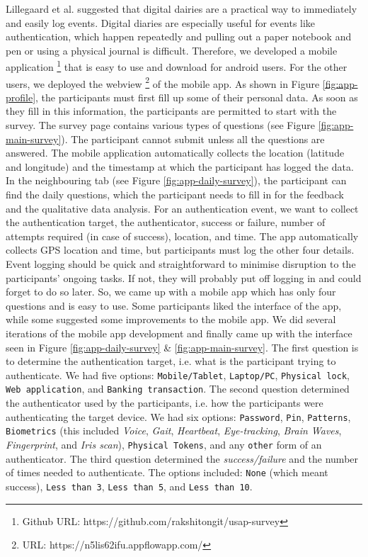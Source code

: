 Lillegaard et al. \cite{lillegaard} suggested that digital dairies are a practical way to immediately and easily log events. Digital diaries are especially useful for events like authentication, which happen repeatedly and pulling out a paper notebook and pen or using a physical journal is difficult. Therefore, we developed a mobile application%
\footnote{Github URL: https://github.com/rakshitongit/usap-survey} that is easy to use and download for android users. For the other users, we deployed the webview%
\footnote{URL: https://n5lis62ifu.appflowapp.com/} of the mobile app. As shown in Figure \ref{fig:app-profile}, the participants must first fill up some of their personal data. As soon as they fill in this information, the participants are permitted to start with the survey. The survey page contains various types of questions (see Figure \ref{fig:app-main-survey}). The participant cannot submit unless all the questions are answered. The mobile application automatically collects the location (latitude and longitude) and the timestamp at which the participant has logged the data. In the neighbouring tab (see Figure \ref{fig:app-daily-survey}), the participant can find the daily questions, which the participant needs to fill in for the feedback and the qualitative data analysis. For an authentication event, we want to collect the authentication target, the authenticator, success or failure, number of attempts required (in case of success), location, and time. The app automatically collects GPS location and time, but participants must log the other four details. Event logging should be quick and straightforward to minimise disruption to the participants' ongoing tasks. If not, they will probably put off logging in and could forget to do so later. So, we came up with a mobile app which has only four questions and is easy to use. Some participants liked the interface of the app, while some suggested some improvements to the mobile app. We did several iterations of the mobile app development and finally came up with the interface seen in Figure \ref{fig:app-daily-survey} \& \ref{fig:app-main-survey}. The first question is to determine the authentication target, i.e. what is the participant trying to authenticate. We had five options: \texttt{Mobile/Tablet}, \texttt{Laptop/PC}, \texttt{Physical lock}, \texttt{Web application}, and \texttt{Banking transaction}. The second question determined the authenticator used by the participants, i.e. how the participants were authenticating the target device. We had six options: \texttt{Password}, \texttt{Pin}, \texttt{Patterns}, \texttt{Biometrics} (this included \textit{Voice}, \textit{Gait}, \textit{Heartbeat}, \textit{Eye-tracking}, \textit{Brain Waves}, \textit{Fingerprint}, and \textit{Iris scan}), \texttt{Physical Tokens}, and any \texttt{other} form of an authenticator. The third question determined the \textit{success/failure} and the number of times needed to authenticate. The options included: \texttt{None} (which meant success), \texttt{Less than 3}, \texttt{Less than 5}, and \texttt{Less than 10}.
